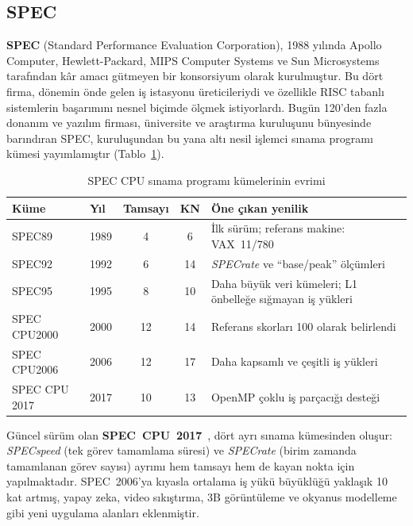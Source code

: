 \subsection{SPEC}
\label{subsec:spec}

\textbf{SPEC} (Standard Performance Evaluation Corporation), 1988 yılında Apollo Computer, Hewlett-Packard, MIPS Computer Systems ve Sun Microsystems tarafından kâr amacı gütmeyen bir konsorsiyum olarak kurulmuştur. Bu dört firma, dönemin önde gelen iş istasyonu üreticileriydi ve özellikle RISC tabanlı sistemlerin başarımını nesnel biçimde ölçmek istiyorlardı. Bugün 120'den fazla donanım ve yazılım firması, üniversite ve araştırma kuruluşunu bünyesinde barındıran SPEC, kuruluşundan bu yana altı nesil işlemci sınama programı kümesi yayımlamıştır (Tablo~\ref{tab:spec-nesiller}).

\begin{table}[H]
\centering
\caption{SPEC CPU sınama programı kümelerinin evrimi}
\label{tab:spec-nesiller}
\small
\begin{tabular}{@{}llccp{7.5cm}@{}}
\toprule
\textbf{Küme} & \textbf{Yıl} & \textbf{Tamsayı} & \textbf{KN} & \textbf{Öne çıkan yenilik} \\
\midrule
SPEC89       & 1989 &  4 &  6 & İlk sürüm; referans makine: VAX~11/780 \\
SPEC92       & 1992 &  6 & 14 & \emph{SPECrate} ve ``base/peak'' ölçümleri \\
SPEC95       & 1995 &  8 & 10 & Daha büyük veri kümeleri; L1 önbelleğe sığmayan iş yükleri \\
SPEC CPU2000 & 2000 & 12 & 14 & Referans skorları 100 olarak belirlendi \\
SPEC CPU2006 & 2006 & 12 & 17 & Daha kapsamlı ve çeşitli iş yükleri \\
SPEC CPU 2017 & 2017 & 10 & 13 & OpenMP\index{OpenMP} çoklu iş parçacığı desteği \\
\bottomrule
\end{tabular}
\end{table}

Güncel sürüm olan \textbf{SPEC~CPU~2017}~\cite{bucek2018}, dört ayrı sınama kümesinden oluşur: \emph{SPECspeed} (tek görev tamamlama süresi) ve \emph{SPECrate} (birim zamanda tamamlanan görev sayısı) ayrımı hem tamsayı hem de kayan nokta için yapılmaktadır. SPEC~2006'ya kıyasla ortalama iş yükü büyüklüğü yaklaşık 10 kat artmış, yapay zeka, video sıkıştırma, 3B görüntüleme ve okyanus modelleme gibi yeni uygulama alanları eklenmiştir.

